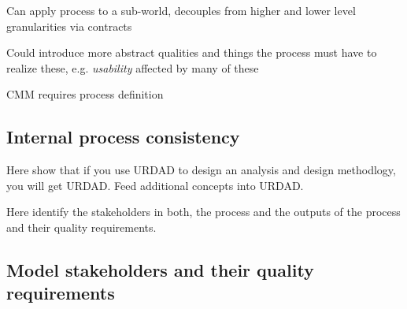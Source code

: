 Can apply process to a sub-world, decouples from higher and lower level granularities via contracts

Could introduce more abstract qualities and things the process must have to realize these, e.g. \emph{usability} affected by many of these

CMM requires process definition


\subsection{Internal process consistency}

Here show that if you use URDAD to design an analysis and design methodlogy, you will get URDAD. Feed additional concepts into URDAD.

Here identify the stakeholders in both, the process and the outputs of the process and their quality requirements.

\subsection{Model stakeholders and their quality requirements}
